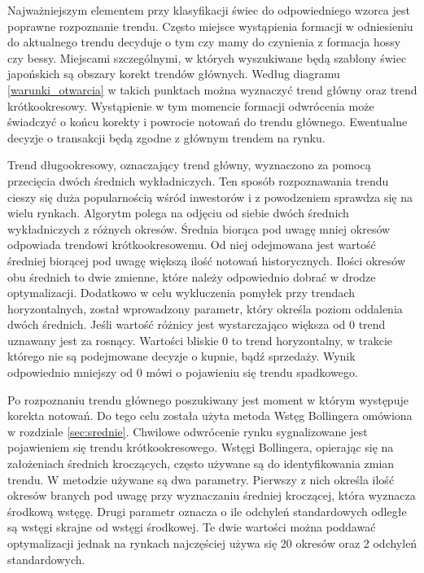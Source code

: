 \documentclass[pdflatex,11pt]{aghdpl}
\begin{document}
Najważniejszym elementem przy klasyfikacji świec do odpowiedniego wzorca jest poprawne rozpoznanie trendu. Często miejsce wystąpienia formacji w odniesieniu do aktualnego trendu decyduje o tym czy mamy do czynienia z formacja hossy czy bessy.  Miejscami szczególnymi, w których wyszukiwane będą szablony świec japońskich są obszary korekt trendów głównych. Według diagramu \ref{warunki_otwarcia} w takich punktach można wyznaczyć trend główny oraz trend krótkookresowy. Wystąpienie w tym momencie formacji odwrócenia może świadczyć o końcu korekty i powrocie notowań do trendu głównego. Ewentualne decyzje o transakcji będą zgodne z głównym trendem na rynku.

Trend długookresowy, oznaczający trend główny, wyznaczono za pomocą przecięcia dwóch średnich wykładniczych. Ten sposób rozpoznawania trendu cieszy się duża popularnością wśród inwestorów i z powodzeniem sprawdza się na wielu rynkach.  Algorytm polega na odjęciu od siebie dwóch średnich wykładniczych z różnych okresów. Średnia biorąca pod uwagę mniej okresów odpowiada trendowi krótkookresowemu. Od niej odejmowana jest wartość średniej biorącej pod uwagę większą ilość notowań historycznych. Ilości okresów obu średnich to dwie zmienne, które należy odpowiednio dobrać w drodze optymalizacji. Dodatkowo w celu wykluczenia pomyłek przy trendach horyzontalnych, został wprowadzony parametr, który określa poziom oddalenia dwóch średnich. Jeśli wartość różnicy jest wystarczająco większa od 0 trend uznawany jest za rosnący. Wartości bliskie 0 to trend horyzontalny, w trakcie którego nie są podejmowane decyzje o kupnie, bądź sprzedaży. Wynik odpowiednio mniejszy od 0 mówi o pojawieniu się trendu spadkowego. 

Po rozpoznaniu trendu głównego poszukiwany jest moment w którym występuje korekta notowań. Do tego celu została użyta metoda Wstęg Bollingera omówiona w rozdziale \ref{sec:srednie}. Chwilowe odwrócenie rynku sygnalizowane jest pojawieniem się trendu krótkookresowego. Wstęgi Bollingera, opierając się na założeniach średnich kroczących, często używane są do identyfikowania zmian trendu. W metodzie używane są dwa parametry. Pierwszy z nich określa ilość okresów branych pod uwagę przy wyznaczaniu średniej kroczącej, która wyznacza środkową wstęgę. Drugi parametr oznacza o ile odchyleń standardowych odległe są wstęgi skrajne od wstęgi środkowej. Te dwie wartości można poddawać optymalizacji jednak na rynkach najczęściej używa się 20 okresów oraz 2 odchyleń standardowych. 
\end{document}
